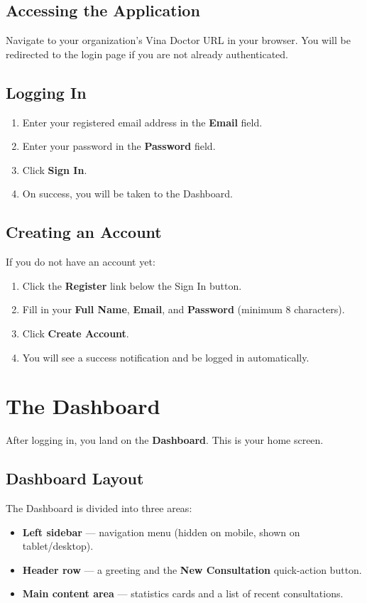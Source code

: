 \documentclass[12pt,a4paper]{article}
\begin{document}
\subsection{Accessing the Application}
Navigate to your organization's Vina Doctor URL in your browser. You will be
redirected to the login page if you are not already authenticated.

\subsection{Logging In}
\begin{enumerate}
	\item Enter your registered email address in the \textbf{Email} field.
	\item Enter your password in the \textbf{Password} field.
	\item Click \textbf{Sign In}.
	\item On success, you will be taken to the Dashboard.
\end{enumerate}

\subsection{Creating an Account}
If you do not have an account yet:
\begin{enumerate}
	\item Click the \textbf{Register} link below the Sign In button.
	\item Fill in your \textbf{Full Name}, \textbf{Email}, and \textbf{Password} (minimum 8 characters).
	\item Click \textbf{Create Account}.
	\item You will see a success notification and be logged in automatically.
\end{enumerate}

\section{The Dashboard}

After logging in, you land on the \textbf{Dashboard}. This is your home screen.

\subsection{Dashboard Layout}
The Dashboard is divided into three areas:
\begin{itemize}
	\item \textbf{Left sidebar} — navigation menu (hidden on mobile, shown on tablet/desktop).
	\item \textbf{Header row} — a greeting and the \textbf{New Consultation} quick-action button.
	\item \textbf{Main content area} — statistics cards and a list of recent consultations.
\end{itemize}
\end{document}
